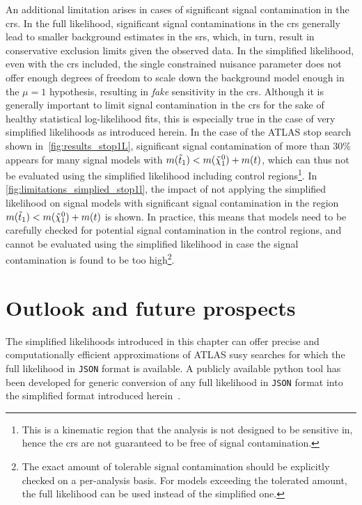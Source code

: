 An additional limitation arises in cases of significant signal contamination in the \glspl{cr}. In the full likelihood, significant signal contaminations in the \glspl{cr} generally lead to smaller background estimates in the \glspl{sr}, which, in turn, result in conservative exclusion limits given the observed data.
In the simplified likelihood, even with the \glspl{cr} included, the single constrained nuisance parameter does not offer enough degrees of freedom to scale down the background model enough in the $\mu = 1$ hypothesis, resulting in \textit{fake} sensitivity in the \glspl{cr}.
Although it is generally important to limit signal contamination in the \glspl{cr} for the sake of healthy statistical log-likelihood fits, this is especially true in the case of very simplified likelihoods as introduced herein.
In the case of the ATLAS stop search shown in~\cref{fig:results_stop1L}, significant signal contamination of more than 30\% appears for many signal models with $m(\tilde{t}_1) < m(\tilde{\chi}_1^0)+m(t)$, which can thus not be evaluated using the simplified likelihood including control regions\footnote{This is a kinematic region that the analysis is not designed to be sensitive in, hence the \glspl{cr} are not guaranteed to be free of signal contamination.}. In \cref{fig:limitations_simplied_stop1l}, the impact of not applying the simplified likelihood on signal models with significant signal contamination in the region $m(\tilde{t}_1) < m(\tilde{\chi}_1^0)+m(t)$ is shown. In practice, this means that models need to be carefully checked for potential signal contamination in the control regions, and cannot be evaluated using the simplified likelihood in case the signal contamination is found to be too high\footnote{The exact amount of tolerable signal contamination should be explicitly checked on a per-analysis basis. For models exceeding the tolerated amount, the full likelihood can be used instead of the simplified one.}.

\section{Outlook and future prospects}

The simplified likelihoods introduced in this chapter can offer precise and computationally efficient approximations of ATLAS \gls{susy} searches for which the full likelihood in \texttt{JSON} format is available. A publicly available python tool has been developed for generic conversion of any full likelihood in \texttt{JSON} format into the simplified format introduced herein~\cite{simplify}.

